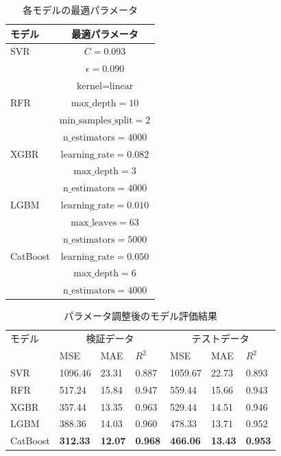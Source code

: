 \begin{table}[tb]
    \centering
    \doublerulesep=0.3pt
    \caption{各モデルの最適パラメータ}
    \label{tab:best_params}
    \begin{tabular}{l|c}
        \hline\hline\hline
        モデル & 最適パラメータ \\
        \hline
        SVR & $C=0.093$ \\ 
            & $\epsilon=0.090$\\
            & $\text{kernel}=\text{linear}$ \\
        \hline
        RFR & $\text{max\_depth}=10$ \\
                     & $\text{min\_samples\_split}=2$ \\
                     & $\text{n\_estimators}=4000$ \\
        \hline
        XGBR & $\text{learning\_rate}=0.082$ \\
                & $\text{max\_depth}=3$ \\
                & $\text{n\_estimators}=4000$ \\
        \hline
        LGBM & $\text{learning\_rate}=0.010$ \\ 
             & $\text{max\_leaves}=63$ \\
             & $\text{n\_estimators}=5000$ \\
        \hline
        CatBoost & $\text{learning\_rate}=0.050$ \\
                 & $\text{max\_depth}=6$ \\
                 & $\text{n\_estimators}=4000$ \\
        \hline\hline\hline
    \end{tabular}
\end{table}

\begin{table}[tb]
    \centering
    \doublerulesep=0.3pt
    \caption{パラメータ調整後のモデル評価結果}
    \label{tab:tuned_results}
    \begin{tabular}{l|p{0.8cm}p{0.8cm}p{0.8cm}|p{0.8cm}p{0.8cm}p{0.8cm}}
        \hline\hline\hline
        モデル & \multicolumn{3}{c|}{検証データ} & \multicolumn{3}{c}{テストデータ} \\
               & MSE & MAE & $R^2$ & MSE & MAE & $R^2$ \\
        \hline
        SVR       & 1096.46 & 23.31 & 0.887 & 1059.67 & 22.73 & 0.893 \\
        RFR       & 517.24  & 15.84 & 0.947 & 559.44  & 15.66 & 0.943 \\
        XGBR      & 357.44  & 13.35 & 0.963 & 529.44  & 14.51 & 0.946 \\
        LGBM      & 388.36  & 14.03 & 0.960 & 478.33  & 13.71 & 0.952 \\
        CatBoost  & \textbf{312.33}  & \textbf{12.07} & \textbf{0.968} & \textbf{466.06}  & \textbf{13.43} & \textbf{0.953} \\
        \hline\hline\hline
    \end{tabular}
\end{table}


